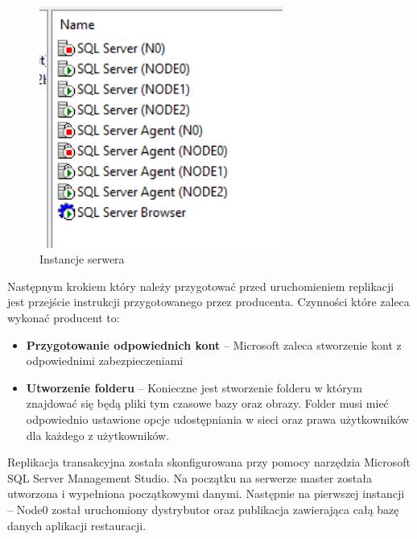\documentclass{article}
\begin{document}
	\begin{figure}[hbt!]
		\includegraphics[width=8cm]{Files/Pictures/instancje}
		\centering
		\caption{Instancje serwera}
	\end{figure}
	

	
	Następnym krokiem który należy przygotować przed uruchomieniem replikacji jest przejście instrukcji przygotowanego przez producenta. Czynności które zaleca wykonać producent to:
	
	\begin{itemize}
	\item	\textbf{Przygotowanie odpowiednich kont} – Microsoft zaleca stworzenie kont z odpowiednimi zabezpieczeniami
	\item	\textbf{Utworzenie folderu} – Konieczne jest stworzenie folderu w którym znajdować się będą 	pliki tym czasowe bazy oraz obrazy. Folder musi mieć odpowiednio ustawione opcje udostępniania w sieci oraz prawa użytkowników dla każdego z użytkowników.
	\end{itemize}
	
	Replikacja transakcyjna została skonfigurowana przy pomocy narzędzia Microsoft SQL Server Management Studio. Na początku na serwerze master została utworzona i wypełniona początkowymi danymi. Następnie na pierwszej instancji – Node0 został uruchomiony dystrybutor oraz publikacja zawierająca całą bazę danych aplikacji restauracji.
	
\end{document}
